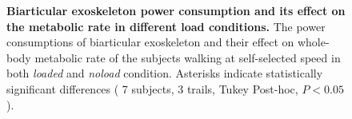 \documentclass[10pt,letterpaper]{article}
\begin{document}
\begin{figure}[th!]
	\centering
	\hfil
	\vspace{2mm}
	\caption{\small{\textbf{Biarticular exoskeleton power consumption and its effect on the metabolic rate in different load conditions.} The power consumptions of biarticular exoskeleton and their effect on whole-body metabolic rate of the subjects walking at self-selected speed in both {\it loaded} and {\it noload} condition. Asterisks indicate statistically significant differences ( 7 subjects, 3 trails, Tukey Post-hoc, $P < 0.05$).}}
	\label{Fig_Case03_Energy_Plot}
\end{figure}
\end{document}
